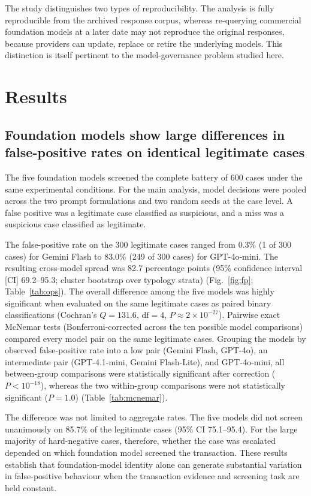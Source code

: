 \documentclass[pdflatex,sn-basic,Numbered]{sn-jnl}
\begin{document}
The study distinguishes two types of reproducibility. The analysis is fully reproducible from the archived response corpus, whereas re-querying commercial foundation models at a later date may not reproduce the original responses, because providers can update, replace or retire the underlying models. This distinction is itself pertinent to the model-governance problem studied here.

\section{Results}\label{sec:results}

\subsection{Foundation models show large differences in false-positive rates on identical legitimate cases}\label{sec:fpspread}

The five foundation models screened the complete battery of 600 cases under the same experimental conditions. For the main analysis, model decisions were pooled across the two prompt formulations and two random seeds at the case level. A false positive was a legitimate case classified as suspicious, and a miss was a suspicious case classified as legitimate.

The false-positive rate on the 300 legitimate cases ranged from 0.3\% (1 of 300 cases) for Gemini Flash to 83.0\% (249 of 300 cases) for GPT-4o-mini. The resulting cross-model spread was 82.7 percentage points (95\% confidence interval [CI] 69.2--95.3; cluster bootstrap over typology strata) (Fig.~\ref{fig:fp}; Table~\ref{tab:ops}). The overall difference among the five models was highly significant when evaluated on the same legitimate cases as paired binary classifications (Cochran's $Q = 131.6$, $\mathrm{df}=4$, $P \approx 2\times10^{-27}$). Pairwise exact McNemar tests (Bonferroni-corrected across the ten possible model comparisons) compared every model pair on the same legitimate cases. Grouping the models by observed false-positive rate into a low pair (Gemini Flash, GPT-4o), an intermediate pair (GPT-4.1-mini, Gemini Flash-Lite), and GPT-4o-mini, all between-group comparisons were statistically significant after correction ($P < 10^{-18}$), whereas the two within-group comparisons were not statistically significant ($P = 1.0$) (Table~\ref{tab:mcnemar}).

The difference was not limited to aggregate rates. The five models did not screen unanimously on 85.7\% of the legitimate cases (95\% CI 75.1--95.4). For the large majority of hard-negative cases, therefore, whether the case was escalated depended on which foundation model screened the transaction. These results establish that foundation-model identity alone can generate substantial variation in false-positive behaviour when the transaction evidence and screening task are held constant.
\end{document}
